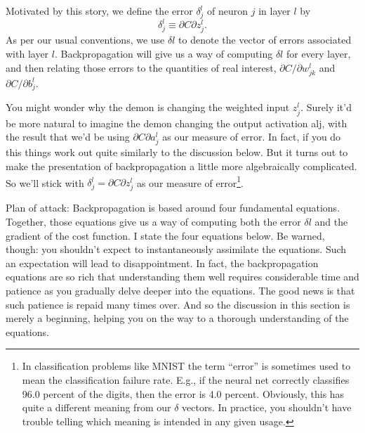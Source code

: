 \documentclass[a4paper,twoside,10pt]{book}
\begin{document}
Motivated by this story, we define the error $\delta^l_j$ of neuron $j$ in layer $l$ by
\begin{equation}
	\delta^l_j\equiv\partial{}C\partial{}z^l_j.\label{eq:29}
\end{equation}
As per our usual conventions, we use $\delta{}l$ to denote the vector of errors associated with layer $l$. Backpropagation will give us a way of computing $\delta{}l$ for every layer, and then relating those errors to the quantities of real interest, $\partial{}C/\partial{}w^l_{jk}$ and $\partial{}C/\partial{}b^l_j$.

You might wonder why the demon is changing the weighted input $z^l_j$. Surely it'd be more natural to imagine the demon changing the output activation alj, with the result that we'd be using $\partial{}C\partial{}a^l_j$ as our measure of error. In fact, if you do this things work out quite similarly to the discussion below. But it turns out to make the presentation of backpropagation a little more algebraically complicated. So we'll stick with $\delta^l_j=\partial{}C\partial{}z^l_j$ as our measure of error\footnote{In classification problems like MNIST the term ``error'' is sometimes used to mean the classification failure rate. E.g., if the neural net correctly classifies 96.0 percent of the digits, then the error is 4.0 percent. Obviously, this has quite a different meaning from our $\delta$ vectors. In practice, you shouldn't have trouble telling which meaning is intended in any given usage.}.

Plan of attack: Backpropagation is based around four fundamental equations. Together, those equations give us a way of computing both the error $\delta{}l$ and the gradient of the cost function. I state the four equations below. Be warned, though: you shouldn't expect to instantaneously assimilate the equations. Such an expectation will lead to disappointment. In fact, the backpropagation equations are so rich that understanding them well requires considerable time and patience as you gradually delve deeper into the equations. The good news is that such patience is repaid many times over. And so the discussion in this section is merely a beginning, helping you on the way to a thorough understanding of the equations.
\end{document}
